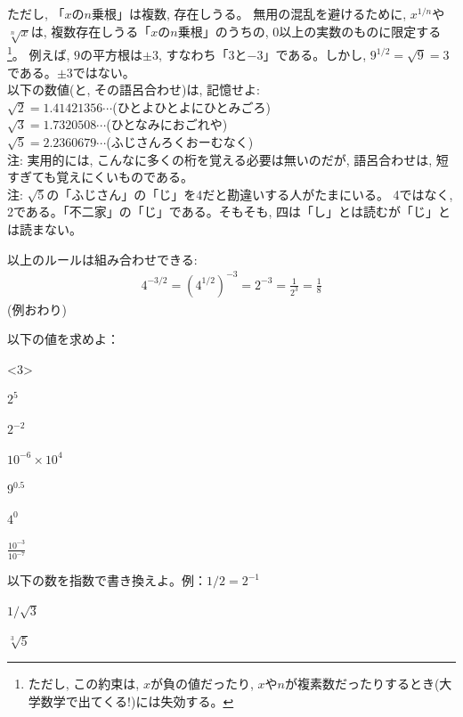 ただし, 「$x$の$n$乗根」は複数, 存在しうる。
無用の混乱を避けるために, $x^{1/n}$や$\sqrt[n]{x}$は, 
複数存在しうる「$x$の$n$乗根」のうちの, 
0以上の実数のものに限定する\footnote{ただし, この約束は, $x$が負の値だったり, 
$x$や$n$が複素数だったりするとき(大学数学で出てくる!)には失効する。}。
例えば, $9$の平方根は$\pm 3$, すなわち「$3$と$-3$」である。しかし, 
$9^{1/2}=\sqrt{9}=3$である。$\pm 3$ではない。\\

以下の数値(と, その語呂合わせ)は, 記憶せよ:\\
$\sqrt{2}=1.41421356\cdots$(ひとよひとよにひとみごろ)\\
$\sqrt{3}=1.7320508\cdots$(ひとなみにおごれや)\\
$\sqrt{5}=2.2360679\cdots$(ふじさんろくおーむなく)\\
{\small 注: 実用的には, こんなに多くの桁を覚える必要は無いのだが, 
語呂合わせは, 短すぎても覚えにくいものである。\\}
{\small 注: $\sqrt{5}$の「ふじさん」の「じ」を4だと勘違いする人がたまにいる。
4ではなく, 2である。「不二家」の「じ」である。そもそも, 四は「し」とは読むが「じ」とは読まない。}

\begin{exmpl} 以上のルールは組み合わせできる:
\begin{eqnarray*}4^{-3/2}=(4^{1/2})^{-3}=2^{-3}=\frac{1}{2^3}=\frac{1}{8}\end{eqnarray*}
(例おわり)\end{exmpl}
\mv

\begin{q}\label{q:alg_pow0} 
以下の値を求めよ：
\begin{edaenumerate}<3>
\item $2^5$
\item $2^{-2}$
\item $10^{-6} \times 10^4$
\item $9^{0.5}$
\item $4^0$
\item $\frac{10^{-3}}{10^{-7}}$
\end{edaenumerate}
\end{q}
\mv

\begin{q}\label{q:alg_pow1} 
以下の数を指数で書き換えよ。例：$1/2=2^{-1}$
\begin{edaenumerate}
\item $1/\sqrt{3}$
\item $\sqrt[3]{5}$
\end{edaenumerate}
\end{q}
\mv

